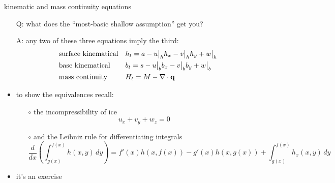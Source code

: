 \begin{frame}{kinematic and mass continuity equations}

\begin{itemize}
\item[Q:] what does the ``most-basic shallow assumption'' get you?
\item[A:] any two of these three equations imply the third:
\small
\begin{align*}
&\text{surface kinematical} && h_t = a - u\big|_h h_x - v\big|_h h_y + w\big|_h  \\
&\text{base kinematical} && b_t = s - u\big|_b b_x - v\big|_b b_y + w\big|_b  \\
&\text{mass continuity} && H_t = M - \nabla\cdot \mathbf{q}
\end{align*}
\normalsize

\bigskip
\item to show the equivalences recall:
  \begin{itemize}
  \item[$\circ$]  the incompressibility of ice
    $$u_x + v_y + w_z = 0$$
  \item[$\circ$]  and the Leibniz rule for differentiating integrals
  \scriptsize
    $$\frac{d}{dx}\left(\int_{g(x)}^{f(x)} h(x,y)\,dy\right) = f'(x) h(x,f(x)) - g'(x) h(x,g(x)) + \int_{g(x)}^{f(x)} h_x(x,y)\,dy$$
  \end{itemize}
\item it's an exercise
\end{itemize}
\end{frame}


